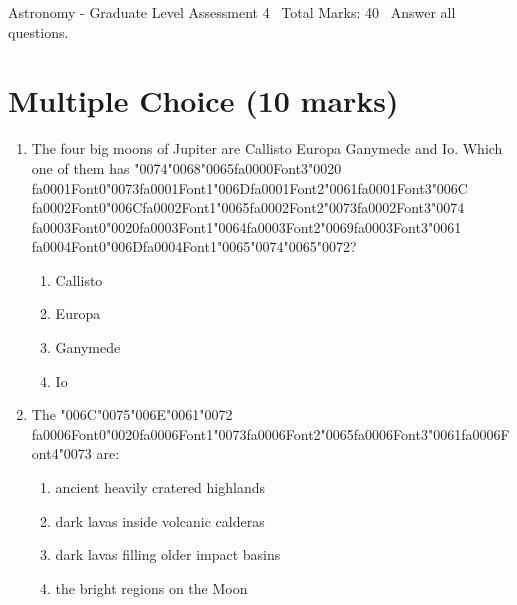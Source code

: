 \documentclass[12pt]{article}
\begin{document}
\begin{center}
Astronomy - Graduate Level Assessment 4 \
Total Marks: 40 \
Answer all questions.
\end{center}

\section*{Multiple Choice (10 marks)}
\begin{enumerate}[label=\arabic*.]
\item The four big moons of Jupiter are Callisto Europa Ganymede and Io. Which one of them has
{\char"0074}{\char"0068}{\char"0065}{\csname fa0000Font3\endcsname\char"0020} {\csname fa0001Font0\endcsname\char"0073}{\csname fa0001Font1\endcsname\char"006D}{\csname fa0001Font2\endcsname\char"0061}{\csname fa0001Font3\endcsname\char"006C} {\csname fa0002Font0\endcsname\char"006C}{\csname fa0002Font1\endcsname\char"0065}{\csname fa0002Font2\endcsname\char"0073}{\csname fa0002Font3\endcsname\char"0074} {\csname fa0003Font0\endcsname\char"0020}{\csname fa0003Font1\endcsname\char"0064}{\csname fa0003Font2\endcsname\char"0069}{\csname fa0003Font3\endcsname\char"0061} {\csname fa0004Font0\endcsname\char"006D}{\csname fa0004Font1\endcsname\char"0065}{\char"0074}{\char"0065}{\char"0072}?
\begin{enumerate}[label=(\alph*)]
    \item Callisto
    \item Europa
    \item Ganymede
    \item Io
\end{enumerate}
\item The {\char"006C}{\char"0075}{\char"006E}{\char"0061}{\char"0072} {\csname fa0006Font0\endcsname\char"0020}{\csname fa0006Font1\endcsname\char"0073}{\csname fa0006Font2\endcsname\char"0065}{\csname fa0006Font3\endcsname\char"0061}{\csname fa0006Font4\endcsname\char"0073} are:
\begin{enumerate}[label=(\alph*)]
    \item ancient heavily cratered highlands
    \item dark lavas inside volcanic calderas
    \item dark lavas filling older impact basins
    \item the bright regions on the Moon
\end{enumerate}

\end{enumerate}
\end{document}
